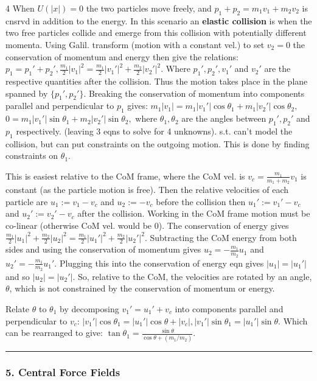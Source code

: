 \documentclass[landscape, 8pt]{extarticle}
\begin{document}
\begin{multicols*}{4}
		When $U(|x|)=0$ the two particles move freely, and $p_1+p_2=m_1v_1+m_2v_2$ is cnsrvd in addition to the energy. In this scenario an \textbf{elastic collision} is when the two free particles collide and emerge from this collision with potentially different momenta. Using Galil. transform (motion with a constant vel.) to set $v_2=0$ the conservation of momentum and energy then give the relations:
		$
		p_1 = p_1'+p_2',  \frac{m_1}{2}|v_1|^2=\frac{m_1}{2}|v_1'|^2+\frac{m_2}{2}|v_2'|^2.
		$
		Where $p_1',p_2',v_1'$ and $v_2'$ are the respective quantities after the collision. Thus the motion takes place in the plane spanned by $\{p_1',p_2'\}$. Breaking the conservation of momentum into components parallel and perpendicular to $p_1$ gives:
		$
		m_1|v_1| = m_1|v_1'|\cos\theta_1+m_1|v_2'|\cos\theta_2,
		$
		$
		0 = m_1|v_1'|\sin\theta_1+m_2|v_2'|\sin\theta_2,
		$
		where $\theta_1,\theta_2$ are the angles between $p_1',p_2'$ and $p_1$ respectively. (leaving 3 eqns to solve for 4 unknowns). s.t. can't model the collision, but can put constraints on the outgoing motion. This is done by finding constraints on $\theta_1$.
		
		This is easiest relative to the CoM frame, where the CoM vel. is
		$
		v_c = \frac{m_1}{m_1+m_2}v_1
		$
		is constant (as the particle motion is free). Then the relative velocities of each particle are $u_1:=v_1-v_c$ and $u_2:=-v_c$ before the collision then $u_1':=v_1'-v_c$ and $u_2':=v_2'-v_c$ after the collision. Working in the CoM frame motion must be co-linear (otherwise CoM vel. would be 0). The conservation of energy gives
		$
		\frac{m_1}{2}|u_1|^2+\frac{m_2}{2}|u_2|^2 = \frac{m_1}{2}|u_1'|^2+\frac{m_2}{2}|u_2'|^2.
		$
		Subtracting the CoM energy from both sides and using the conservation of momentum gives $u_2=-\frac{m_1}{m_2}u_1$ and $u_2'=-\frac{m_1}{m_2}u_1'$. Plugging this into the conservation of energy eqn gives $|u_1|=|u_1'|$ and so $|u_2|=|u_2'|$. So, relative to the CoM, the velocities are rotated by an angle, $\theta$, which is not constrained by the conservation of momentum or energy.
		
		Relate $\theta$ to $\theta_1$ by decomposing $v_1'=u_1'+v_c$ into components parallel and perpendicular to $v_c$:
		$
		|v_1'|\cos\theta_1 = |u_1'|\cos\theta+|v_c|,  |v_1'|\sin\theta_1=|u_1'|\sin\theta.
		$
		Which can be rearranged to give:
		$
		\tan\theta_1 = \frac{\sin\theta}{\cos\theta+(m_1/m_2)}.
		$
		
		\hrule
		\vspace*{-3pt}
		\subsubsection*{\tiny{5. Central Force Fields}}
		\vspace*{-4pt}
		

\end{multicols*}
\end{document}
